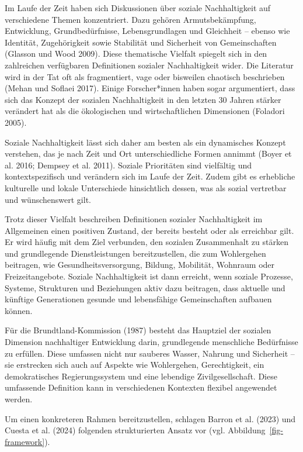 \documentclass[
  nswissgerman,
  a4paper,
  DIV=11,
  numbers=noendperiod,
  oneside,
  openany]{scrreprt}
\begin{document}
Im Laufe der Zeit haben sich Diskussionen über soziale Nachhaltigkeit
auf verschiedene Themen konzentriert. Dazu gehören Armutsbekämpfung,
Entwicklung, Grundbedürfnisse, Lebensgrundlagen und Gleichheit -- ebenso
wie Identität, Zugehörigkeit sowie Stabilität und Sicherheit von
Gemeinschaften (Glasson und Wood 2009). Diese thematische Vielfalt
spiegelt sich in den zahlreichen verfügbaren Definitionen sozialer
Nachhaltigkeit wider. Die Literatur wird in der Tat oft als
fragmentiert, vage oder bisweilen chaotisch beschrieben (Mehan und
Soflaei 2017). Einige Forscher*innen haben sogar argumentiert, dass sich
das Konzept der sozialen Nachhaltigkeit in den letzten 30 Jahren stärker
verändert hat als die ökologischen und wirtschaftlichen Dimensionen
(Foladori 2005).

Soziale Nachhaltigkeit lässt sich daher am besten als ein dynamisches
Konzept verstehen, das je nach Zeit und Ort unterschiedliche Formen
annimmt (Boyer et al. 2016; Dempsey et al. 2011). Soziale Prioritäten
sind vielfältig und kontextspezifisch und verändern sich im Laufe der
Zeit. Zudem gibt es erhebliche kulturelle und lokale Unterschiede
hinsichtlich dessen, was als sozial vertretbar und wünschenswert gilt.

Trotz dieser Vielfalt beschreiben Definitionen sozialer Nachhaltigkeit
im Allgemeinen einen positiven Zustand, der bereits besteht oder als
erreichbar gilt. Er wird häufig mit dem Ziel verbunden, den sozialen
Zusammenhalt zu stärken und grundlegende Dienstleistungen
bereitzustellen, die zum Wohlergehen beitragen, wie
Gesundheitsversorgung, Bildung, Mobilität, Wohnraum oder
Freizeitangebote. Soziale Nachhaltigkeit ist dann erreicht, wenn soziale
Prozesse, Systeme, Strukturen und Beziehungen aktiv dazu beitragen, dass
aktuelle und künftige Generationen gesunde und lebensfähige
Gemeinschaften aufbauen können.

Für die Brundtland-Kommission (1987) besteht das Hauptziel der sozialen
Dimension nachhaltiger Entwicklung darin, grundlegende menschliche
Bedürfnisse zu erfüllen. Diese umfassen nicht nur sauberes Wasser,
Nahrung und Sicherheit -- sie erstrecken sich auch auf Aspekte wie
Wohlergehen, Gerechtigkeit, ein demokratisches Regierungssystem und eine
lebendige Zivilgesellschaft. Diese umfassende Definition kann in
verschiedenen Kontexten flexibel angewendet werden.

Um einen konkreteren Rahmen bereitzustellen, schlagen Barron et al.
(2023) und Cuesta et al. (2024) folgenden strukturierten Ansatz vor
(vgl. Abbildung~\ref{fig-framework}).
\end{document}
